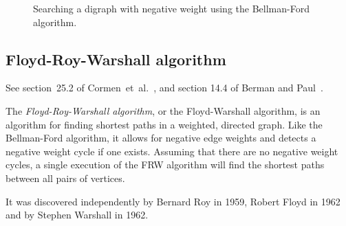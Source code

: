 \begin{figure}[!htbp]
\centering
{}
\caption{Searching a digraph with negative weight using the
  Bellman-Ford algorithm.}
\label{fig:graph_algorithms:Bellman_Ford_negative_weights}
\end{figure}



\subsection{Floyd-Roy-Warshall algorithm}

See section~25.2 of Cormen~et~al.~\cite{CormenEtAl2001}, and section
14.4 of Berman and Paul~\cite{BermanPaul1997}.

The {\it Floyd-Roy-Warshall algorithm}, or the Floyd-Warshall algorithm,
is an algorithm for finding shortest paths in a weighted, directed 
graph. Like the Bellman-Ford algorithm, it allows for negative
edge weights and detects a negative weight cycle if one exists.
Assuming that there are no negative weight cycles, a single 
execution of the FRW algorithm will find the shortest 
paths between all pairs of vertices.

It was discovered independently by Bernard Roy in 1959, Robert 
Floyd in 1962 and by Stephen Warshall in 1962.

